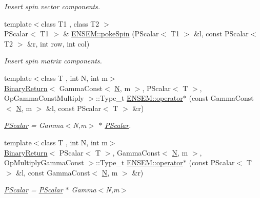 \begin{DoxyCompactItemize}
\begin{DoxyCompactList}\small\item\em Insert spin vector components. \end{DoxyCompactList}\item 
{\footnotesize template$<$class T1 , class T2 $>$ }\\P\+Scalar$<$ T1 $>$ \& \mbox{\hyperlink{group__primscalar_gafc9650865b3cf15e32d79e07d1c01eff}{E\+N\+S\+E\+M\+::poke\+Spin}} (P\+Scalar$<$ T1 $>$ \&l, const P\+Scalar$<$ T2 $>$ \&r, int row, int col)
\begin{DoxyCompactList}\small\item\em Insert spin matrix components. \end{DoxyCompactList}\item 
{\footnotesize template$<$class T , int N, int m$>$ }\\\mbox{\hyperlink{structBinaryReturn}{Binary\+Return}}$<$ Gamma\+Const$<$ \mbox{\hyperlink{adat__devel_2lib_2hadron_2operator__name__util_8cc_a7722c8ecbb62d99aee7ce68b1752f337}{N}}, m $>$, P\+Scalar$<$ T $>$, Op\+Gamma\+Const\+Multiply $>$\+::Type\+\_\+t \mbox{\hyperlink{group__primscalar_gaa4466bc56a8afcb00e7d7e37cc22d441}{E\+N\+S\+E\+M\+::operator$\ast$}} (const Gamma\+Const$<$ \mbox{\hyperlink{adat__devel_2lib_2hadron_2operator__name__util_8cc_a7722c8ecbb62d99aee7ce68b1752f337}{N}}, m $>$ \&l, const P\+Scalar$<$ T $>$ \&r)
\begin{DoxyCompactList}\small\item\em \mbox{\hyperlink{classENSEM_1_1PScalar}{P\+Scalar}} = Gamma$<$\+N,m$>$ $\ast$ \mbox{\hyperlink{classENSEM_1_1PScalar}{P\+Scalar}}. \end{DoxyCompactList}\item 
{\footnotesize template$<$class T , int N, int m$>$ }\\\mbox{\hyperlink{structBinaryReturn}{Binary\+Return}}$<$ P\+Scalar$<$ T $>$, Gamma\+Const$<$ \mbox{\hyperlink{adat__devel_2lib_2hadron_2operator__name__util_8cc_a7722c8ecbb62d99aee7ce68b1752f337}{N}}, m $>$, Op\+Multiply\+Gamma\+Const $>$\+::Type\+\_\+t \mbox{\hyperlink{group__primscalar_ga1f975f2be8a25d77d5b101c1db566a23}{E\+N\+S\+E\+M\+::operator$\ast$}} (const P\+Scalar$<$ T $>$ \&l, const Gamma\+Const$<$ \mbox{\hyperlink{adat__devel_2lib_2hadron_2operator__name__util_8cc_a7722c8ecbb62d99aee7ce68b1752f337}{N}}, m $>$ \&r)
\begin{DoxyCompactList}\small\item\em \mbox{\hyperlink{classENSEM_1_1PScalar}{P\+Scalar}} = \mbox{\hyperlink{classENSEM_1_1PScalar}{P\+Scalar}} $\ast$ Gamma$<$\+N,m$>$ \end{DoxyCompactList}\item 

\end{DoxyCompactItemize}
